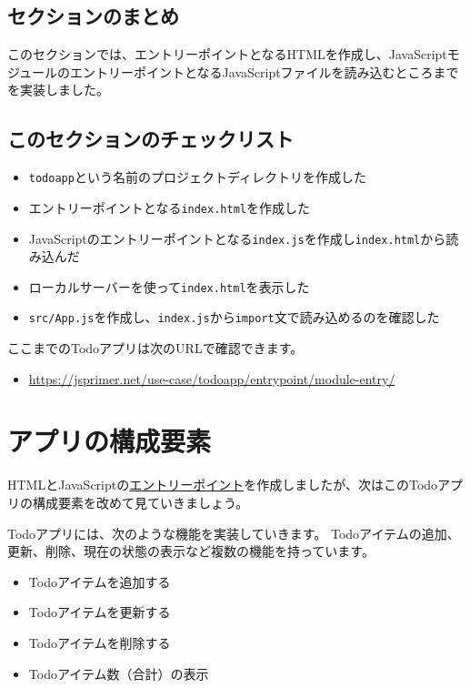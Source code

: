\hypertarget{conclusion}{%
\subsection{セクションのまとめ}\label{conclusion}}

このセクションでは、エントリーポイントとなるHTMLを作成し、JavaScriptモジュールのエントリーポイントとなるJavaScriptファイルを読み込むところまでを実装しました。

\hypertarget{section-checklist}{%
\subsection{このセクションのチェックリスト}\label{section-checklist}}

\begin{itemize}
\item
  \texttt{todoapp}という名前のプロジェクトディレクトリを作成した
\item
  エントリーポイントとなる\texttt{index.html}を作成した
\item
  JavaScriptのエントリーポイントとなる\texttt{index.js}を作成し\texttt{index.html}から読み込んだ
\item
  ローカルサーバーを使って\texttt{index.html}を表示した
\item
  \texttt{src/App.js}を作成し、\texttt{index.js}から\texttt{import}文で読み込めるのを確認した
\end{itemize}

ここまでのTodoアプリは次のURLで確認できます。

\begin{itemize}
\item
  \url{https://jsprimer.net/use-case/todoapp/entrypoint/module-entry/}
\end{itemize}

\hypertarget{app-structure}{%
\section{アプリの構成要素}\label{app-structure}}

HTMLとJavaScriptの\hyperlink{entrypoint_todo}{エントリーポイント}を作成しましたが、次はこのTodoアプリの構成要素を改めて見ていきましょう。

Todoアプリには、次のような機能を実装していきます。
Todoアイテムの追加、更新、削除、現在の状態の表示など複数の機能を持っています。

\begin{itemize}
\item
  Todoアイテムを追加する
\item
  Todoアイテムを更新する
\item
  Todoアイテムを削除する
\item
  Todoアイテム数（合計）の表示
\end{itemize}

